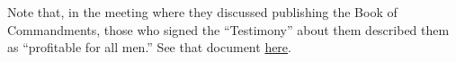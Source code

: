 \begin{compactdesc}
			\item Note that, in the meeting where they discussed publishing the Book of Commandments, those who signed the ``Testimony'' about them described them as ``profitable for all men.'' See that document \hyperref[EMS-1831-JS-CIR-2-NOV-1831-TEST]{here}.
			
		\end{compactdesc}